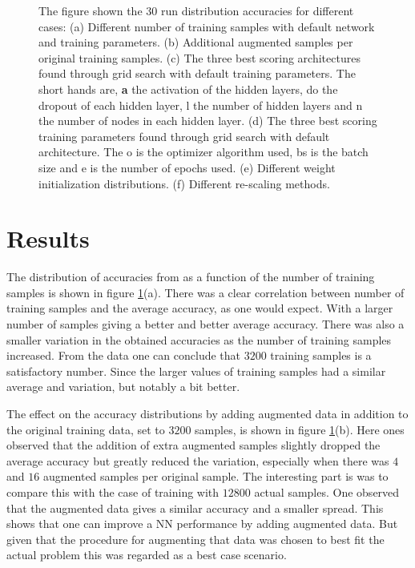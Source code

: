 \documentclass[prl,twocolumn]{revtex4-1}
\begin{document}
\begin{figure}[!tb]
  \caption{The figure shown the 30 run distribution accuracies for different cases:
  (a) Different number of training samples with default network and training parameters. (b) Additional augmented samples per original training samples. (c) The three best scoring architectures found through grid search with default training parameters. The short hands are, \textbf{a} the activation of the hidden layers, do the dropout of each hidden layer, l the number of hidden layers and n the number of nodes in each hidden layer. (d) The three best scoring training parameters found through grid search with default architecture. The o is the optimizer algorithm used, bs is the batch size and e is the number of epochs used. (e) Different weight initialization distributions. (f) Different re-scaling methods.}
  \label{fig:all}
\end{figure}

\section{Results}
The distribution of accuracies from as a function of the number of training samples is shown in figure \ref{fig:all}(a). There was a clear correlation between number of training samples and the average accuracy, as one would expect. With a larger number of samples giving a better and better average accuracy. There was also a smaller variation in the obtained accuracies as the number of training samples increased. From the data one can conclude that $3200$ training samples is a satisfactory number. Since the larger values of training samples had a similar average and variation, but notably a bit better. 

The effect on the accuracy distributions by adding augmented data in addition to the original training data, set to $3200$ samples, is shown in figure \ref{fig:all}(b). Here ones observed that the addition of extra augmented samples slightly dropped the average accuracy but greatly reduced the variation, especially when there was $4$ and $16$ augmented samples per original sample. The interesting part is was to compare this with the case of training with $12800$ actual samples. One observed that the augmented data gives a similar accuracy and a smaller spread. This shows that one can improve a NN performance by adding augmented data. But given that the procedure for augmenting that data was chosen to best fit the actual problem this was regarded as a best case scenario. 
\end{document}
